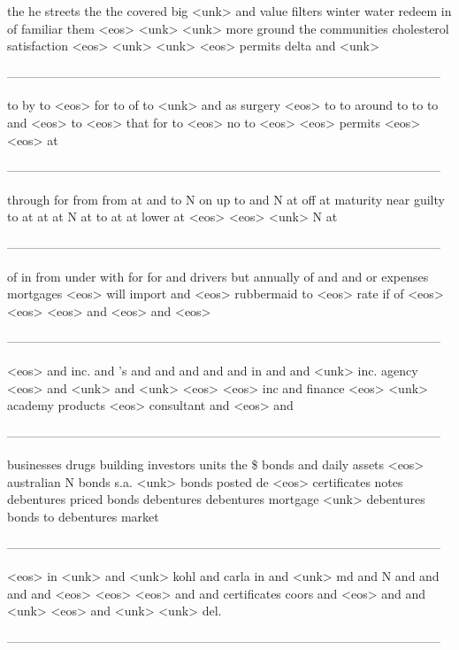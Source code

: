 \begin{enumerate}
the he streets the the covered big <unk> and value filters winter water redeem in of familiar them <eos> <unk> <unk> more ground the communities cholesterol satisfaction <eos> <unk> <unk> <eos> permits delta and <unk>

---------------------------------------------------------------------------------------------------------

to by to <eos> for to of to <unk> and as surgery <eos> to to around to to to and <eos> to <eos> that for to <eos> no to <eos> <eos> permits <eos> <eos> at

---------------------------------------------------------------------------------------------------------

through for from from at and to N on up to and N at off at maturity near guilty to at at at N at to at at lower at <eos> <eos> <unk> N at

---------------------------------------------------------------------------------------------------------

of in from under with for for and drivers but annually of and and or expenses mortgages <eos> will import and <eos> rubbermaid to <eos> rate if of <eos> <eos> <eos> and <eos> and <eos>

---------------------------------------------------------------------------------------------------------

<eos> and inc. and 's and and and and and in and and <unk> inc. agency <eos> and <unk> and <unk> <eos> <eos> inc and finance <eos> <unk> academy products <eos> consultant and <eos> and

---------------------------------------------------------------------------------------------------------

businesses drugs building investors units the \$ bonds and daily assets <eos> australian N bonds s.a. <unk> bonds posted de <eos> certificates notes debentures priced bonds debentures debentures mortgage <unk> debentures bonds to debentures market

---------------------------------------------------------------------------------------------------------

<eos> in <unk> and <unk> kohl and carla in and <unk> md and N and and and and <eos> <eos> <eos> and and certificates coors and <eos> and and <unk> <eos> and <unk> <unk> del.

---------------------------------------------------------------------------------------------------------


\end{enumerate}
